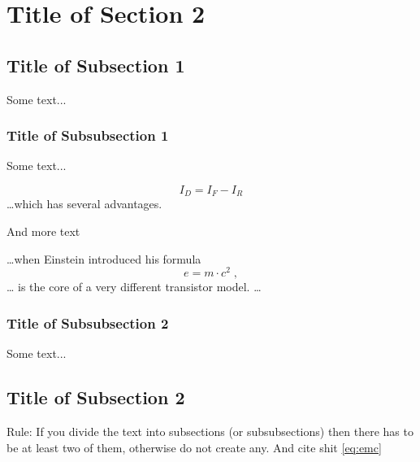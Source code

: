 







\listoftodos

\tableofcontents

\pagebreak





\section{Title of Section 2} 


\subsection{Title of Subsection 1}

Some text...

\subsubsection{Title of Subsubsection 1}

Some text...

\begin{equation} \label{eq:someequation}
I_D = I_F - I_R
\end{equation}
\ldots which has several advantages.


And more text

\ldots when Einstein introduced his formula
\begin{equation} \label{eq:emc}
e = m \cdot c^2 \; ,
\end{equation}
\ldots
is the core of a very different transistor model. \ldots

\subsubsection{Title of Subsubsection 2}

Some text...



\subsection{Title of Subsection 2} 

Rule: If you divide the text into subsections (or subsubsections) then there has to be at least two of them, otherwise do not create any.
And cite shit \ref{eq:emc}

